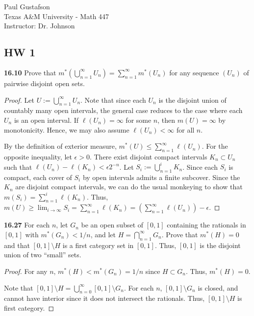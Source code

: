 \documentclass{article}
\newcommand{\p}{\textbf}
\begin{document}
\noindent Paul Gustafson\\
\noindent Texas A\&M University - Math 447\\
\noindent Instructor: Dr. Johnson

\subsection*{HW 1}
\p{16.10} Prove that $m^*(\bigcup_{n=1}^\infty U_n) = \sum_{n=1}^\infty m^*(U_n)$ for any sequence $(U_n)$ of pairwise disjoint open sets.
\begin{proof}
Let $U := \bigcup_{n=1}^\infty U_n$. Note that since each $U_n$ is the disjoint union of countably many open intervals, the general case reduces to the case where each $U_n$ is an open interval. 
If $\ell(U_n) = \infty$ for some $n$, then $m(U) = \infty$ by monotonicity. Hence, we may also assume $\ell(U_n) < \infty$ for all $n$. 

By the definition of exterior measure, $m^*(U) \leq \sum_{n=1}^\infty \ell(U_n)$. For the opposite inequality, let $\epsilon > 0$.  There exist disjoint compact intervals $K_n \subset U_n$ such that $\ell(U_n) - \ell(K_n) < \epsilon 2^{-n}$. Let $S_i := \bigcup_{n=1}^i K_n$.  Since each $S_i$ is compact, each cover of $S_i$ by open intervals admits a finite subcover.  Since the $K_n$ are disjoint compact intervals, we can do the usual monkeying to show that $m(S_i) = \sum_{n=1}^i \ell(K_n)$.  Thus, $m(U) \geq \lim_{i\rightarrow \infty} S_i = \sum_{n=1}^\infty \ell(K_n) = (\sum_{n=1}^\infty \ell(U_n)) - \epsilon$.
\end{proof}



\p{16.27} For each $n$, let $G_n$ be an open subset of $[0,1]$ containing the rationals in $[0,1]$ with $m^*(G_n) < 1/n$, and let $H = \bigcap_{n=1}^\infty G_n$. Prove that $m^*(H) = 0$ and that $[0,1]\setminus H $ is a first category set in $[0,1]$. Thus, $[0,1]$ is the disjoint union of two ``small'' sets.
\begin{proof}
For any $n$, $m^*(H) < m^*(G_n) = 1/n$ since $H \subset G_n$. Thus, $m^*(H) = 0$. 

Note that $[0,1]\setminus H = \bigcup_{n=0}^\infty [0,1]\setminus G_n$. For each $n$, $[0,1]\setminus G_n$ is closed, and cannot have interior since it does not intersect the rationals. Thus, $[0,1]\setminus H$ is first category.
\end{proof}
\end{document}
